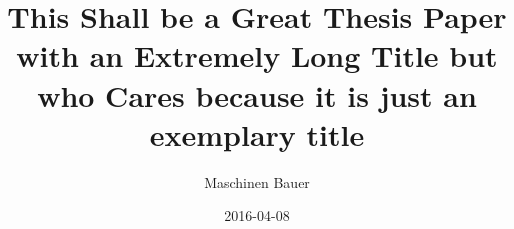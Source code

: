 \title{This Shall be a Great Thesis Paper with an Extremely Long Title but who Cares because it is just an exemplary title}
\author{Maschinen Bauer}
\date{2016-04-08}

\usepackage{lipsum}
